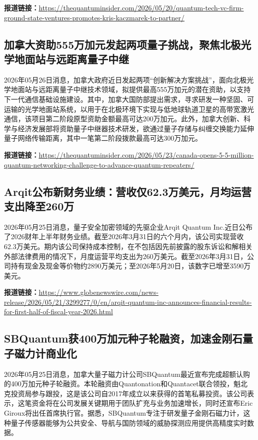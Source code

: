 \documentclass[12pt,a4paper]{ctexart}
\begin{document}
\noindent\textbf{报道链接：}\url{https://thequantuminsider.com/2026/05/20/quantum-tech-vc-firm-ground-state-ventures-promotes-kris-kaczmarek-to-partner/}

\subsection{ 加拿大资助555万加元发起两项量子挑战，聚焦北极光学地面站与远距离量子中继 }

2026年05月26日消息，加拿大政府近日发起两项“创新解决方案挑战”，面向北极光学地面站与远距离量子中继技术领域，拟提供最高555万加元的潜在资助，以支持下一代通信基础设施建设。其中，加拿大国防部提出需求，寻求研发一种坚固、可运输的光学地面站系统，以用于在北极环境下实现与低地球轨道卫星的高带宽激光通信，该项目第二阶段原型资助金额最高可达200万加元。此外，加拿大创新、科学与经济发展部将资助量子中继器技术研发，欲通过量子存储与纠缠交换能力延伸量子网络传输距离，其中一笔第二阶段拨款最高可达300万加元。

\noindent\textbf{报道链接：}\url{https://thequantuminsider.com/2026/05/23/canada-opens-5-5-million-quantum-networking-challenge-to-advance-quantum-repeaters/}

\subsection{ Arqit公布新财务业绩：营收仅62.3万美元，月均运营支出降至260万 }

2026年05月25日消息，量子安全加密领域的先驱企业Arqit Quantum Inc.近日公布了2026财年上半年财务业绩。截至2026年3月31日的六个月内，该公司实现营收62.3万美元。期内该公司保持成本控制，在不包括因先前披露的股东诉讼和解相关外部法律费用的情况下，月度运营平均支出为260万美元。截至2026年3月31日，公司持有现金及现金等价物约2890万美元；至2026年5月20日，该数字已增至3590万美元。

\noindent\textbf{报道链接：}\url{https://www.globenewswire.com/news-release/2026/05/21/3299277/0/en/arqit-quantum-inc-announces-financial-results-for-first-half-of-fiscal-year-2026.html}

\subsection{ SBQuantum获400万加元种子轮融资，加速金刚石量子磁力计商业化 }

2026年05月25日消息，加拿大量子磁力计公司SBQuantum最近宣布完成超额认购的400万加元种子轮融资。本轮融资由Quantonation和Quantacet联合领投，魁北克投资局参与跟投，这是该公司自2017年成立以来获得的首笔私募投资。该公司表示，这笔资金将在公司发展关键期用于团队扩充与业务加速增长，同时还宣布Eric Giroux将出任首席执行官。据悉，SBQuantum专注于研发量子金刚石磁力计，这种量子传感器能够为公共安全、导航与国防领域的威胁探测应用提供高精度实时数据。
\end{document}
